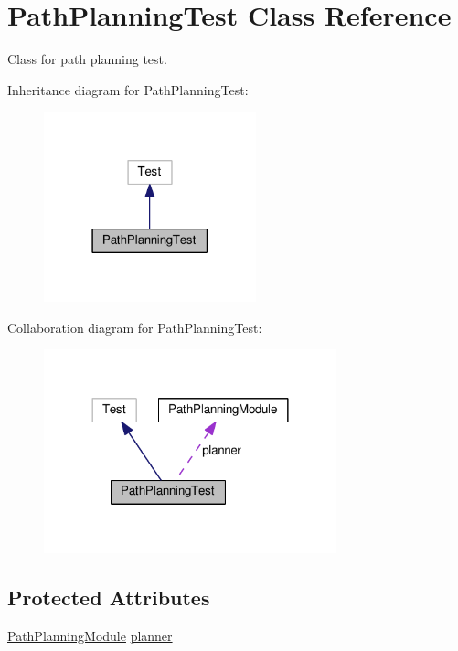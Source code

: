 \hypertarget{class_path_planning_test}{}\section{Path\+Planning\+Test Class Reference}
\label{class_path_planning_test}


Class for path planning test.  




Inheritance diagram for Path\+Planning\+Test\+:
\nopagebreak
\begin{figure}[H]
\begin{center}
\leavevmode
\includegraphics[width=174pt]{class_path_planning_test__inherit__graph}
\end{center}
\end{figure}


Collaboration diagram for Path\+Planning\+Test\+:
\nopagebreak
\begin{figure}[H]
\begin{center}
\leavevmode
\includegraphics[width=240pt]{class_path_planning_test__coll__graph}
\end{center}
\end{figure}
\subsection*{Protected Attributes}
\begin{DoxyCompactItemize}
\item 
\hyperlink{class_path_planning_module}{Path\+Planning\+Module} \hyperlink{class_path_planning_test_af307c6073040bffa9d602969d81ae254}{planner}
\end{DoxyCompactItemize}


